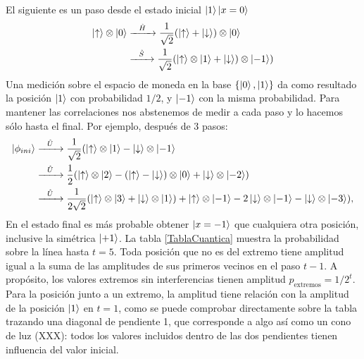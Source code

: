 El siguiente es un paso desde el estado inicial $\ket{1}\ket{x=0}$
\begin{align*}
\ket{\uparrow}\otimes\ket{0}&\xrightarrow{\;\;\;\hat{H}\;\;\;}\dfrac{1}{\sqrt{2}}(\ket{\uparrow}+\ket{\downarrow})\otimes\ket{0}\\
&\xrightarrow{\;\;\;\hat{S}\;\;\;}\dfrac{1}{\sqrt{2}}(\ket{\uparrow}\otimes\ket{1}+\ket{\downarrow})\otimes\ket{-1})
\end{align*}{}
Una medición sobre el espacio de moneda en la base $\{\ket{0},\ket{1}\}$ da como resultado la posición $\ket{1}$ con probabilidad $1/2$, y $\ket{-1}$ con la misma probabilidad.
Para mantener las correlaciones nos abstenemos de medir a cada paso y lo hacemos sólo hasta el final. Por ejemplo, después de 3 pasos:
\begin{align*}
\ket{\phi_{ini}}&\xrightarrow{\;\;\;\hat{U}\;\;\;}\dfrac{1}{\sqrt{2}}(\ket{\uparrow}\otimes\ket{1}-\ket{\downarrow}\otimes\ket{-1}\\
&\xrightarrow{\;\;\;\hat{U}\;\;\;}\dfrac{1}{2}(\ket{\uparrow}\otimes\ket{2}-(\ket{\uparrow}-\ket{\downarrow})\otimes\ket{0}+\ket{\downarrow}\otimes\ket{-2})\\
&\xrightarrow{\;\;\;\hat{U}\;\;\;}\dfrac{1}{2\sqrt{2}}(\ket{\uparrow}\otimes\ket{3}+\ket{\downarrow}\otimes\ket{1})+\ket{\uparrow}\otimes\ket{-1}-2\ket{\downarrow}\otimes\ket{-1}-\ket{\downarrow}\otimes\ket{-3}),
\end{align*}{}
En el estado final es más probable obtener $\ket{x=-1}$ que cualquiera otra posición, inclusive la simétrica $\ket{+1}$. La tabla \ref{TablaCuantica} muestra la probabilidad sobre la línea hasta $t=5$. Toda posición que no es del extremo tiene amplitud igual a la suma de las amplitudes de sus primeros vecinos en el paso $t-1$. A propósito, los valores extremos sin interferencias tienen amplitud $p_{\text{extremos}}=1/2^t$. Para la posición junto a un extremo, la amplitud tiene relación con la amplitud de la posición $\ket{1}$ en $t=1$, como se puede comprobar directamente sobre la tabla trazando una diagonal de pendiente 1, que corresponde a algo así como un cono de luz (XXX): todos los valores incluidos dentro de las dos pendientes tienen influencia del valor inicial.\\

